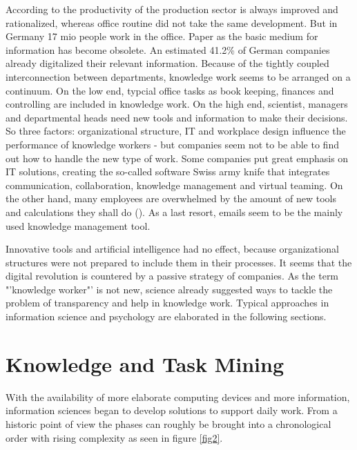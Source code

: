 According to \cite{spaeth2009info} the productivity of the production sector is always improved and rationalized, whereas office routine did not take the same development. But in Germany 17 mio people work in the office. Paper as the basic medium for information has become obsolete. An estimated 41.2\% of German companies already digitalized their relevant information. Because of the tightly coupled interconnection between departments, knowledge work seems to be arranged on a continuum. On the low end, typcial office tasks as book keeping, finances and controlling are included in knowledge work. On the high end, scientist, managers and departmental heads need new tools and information to make their decisions. So three factors: organizational structure, IT and workplace design influence the performance of knowledge workers - but companies seem not to be able to find out how to handle the new type of work. Some companies put great emphasis on IT solutions, creating the so-called software Swiss army knife that integrates communication, collaboration, knowledge management and virtual teaming. On the other hand, many employees are overwhelmed by the amount of new tools and calculations they shall do (\cite{davenport2012mysterious}). As a last resort, emails seem to be the mainly used knowledge management tool. 

Innovative tools and artificial intelligence had no effect, because organizational structures were not prepared to include them in their processes. It seems that the digital revolution is countered by a passive strategy of companies. As the term "'knowledge worker"' is not new, science already suggested ways to tackle the problem of transparency and help in knowledge work. Typical approaches in information science and psychology are elaborated in the following sections.

\section{Knowledge and Task Mining}
\label{knowledgeandtask}
With the availability of more elaborate computing devices and more information, information sciences began to develop solutions to support daily work. From a historic point of view the phases can roughly be brought into a chronological order with rising complexity as seen in figure \ref{fig2}. 

